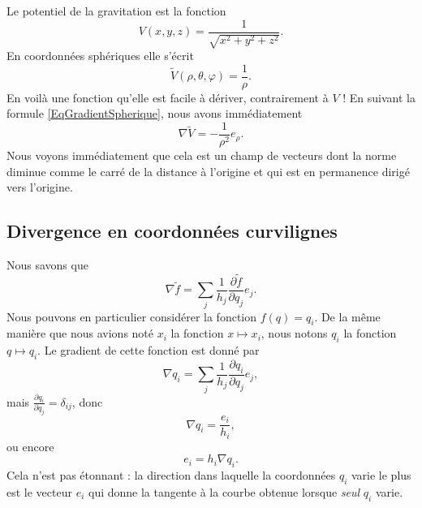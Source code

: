 \begin{example}
	Le potentiel de la gravitation est la fonction
	\begin{equation}
		V(x,y,z)=\frac{1}{ \sqrt{x^2+y^2+z^2} }.
	\end{equation}
	En coordonnées sphériques elle s'écrit
	\begin{equation}
		\tilde V(\rho,\theta,\varphi)=\frac{1}{ \rho }.
	\end{equation}
	En voilà une fonction qu'elle est facile à dériver, contrairement à \( V\) ! En suivant la formule \eqref{EqGradientSpherique}, nous avons immédiatement
	\begin{equation}
		\nabla\tilde V=-\frac{1}{ \rho^2 }e_{\rho}.
	\end{equation}
	Nous voyons immédiatement que cela est un champ de vecteurs dont la norme diminue comme le carré de la distance à l'origine et qui est en permanence dirigé vers l'origine.
\end{example}

\subsection{Divergence en coordonnées curvilignes}

Nous savons que
\begin{equation}
	\nabla\tilde f=\sum_j\frac{1}{ h_j }\frac{ \partial \tilde f }{ \partial q_j }e_j.
\end{equation}
Nous pouvons en particulier considérer la fonction \( f(q)=q_i\). De la même manière que nous avions noté \( x_i\) la fonction \( x\mapsto x_i\), nous notons \( q_i\) la fonction \( q\mapsto q_i\). Le gradient de cette fonction est donné par
\begin{equation}
	\nabla q_i=\sum_j\frac{1}{ h_j }\frac{ \partial q_i }{ \partial q_j }e_j,
\end{equation}
mais \( \frac{ \partial q_i }{ \partial q_j }=\delta_{ij}\), donc
\begin{equation}
	\nabla q_i=\frac{ e_i }{ h_i },
\end{equation}
ou encore
\begin{equation}
	e_i=h_i\nabla q_i.
\end{equation}
Cela n'est pas étonnant : la direction dans laquelle la coordonnées \( q_i\) varie le plus est le vecteur \( e_i\) qui donne la tangente à la courbe obtenue lorsque \emph{seul} \( q_i\) varie.

